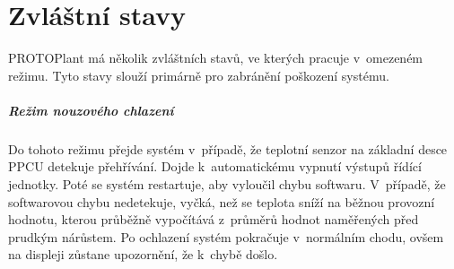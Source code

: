 \chapter{Zvláštní stavy}
PROTOPlant má několik zvláštních stavů, ve kterých pracuje v~omezeném režimu.
Tyto stavy slouží primárně pro zabránění poškození systému.

\paragraph{Režim nouzového chlazení}
\label{paragraph:CoolingMode}
Do tohoto režimu přejde systém v~případě, že teplotní senzor na základní desce PPCU detekuje přehřívání. 
Dojde k~automatickému vypnutí výstupů řídící jednotky.
Poté se systém restartuje, aby vyloučil chybu softwaru.
V~případě, že softwarovou chybu nedetekuje, vyčká, než se teplota sníží na běžnou provozní hodnotu, kterou průběžně vypočítává z~průměrů hodnot naměřených před prudkým nárůstem.
Po ochlazení systém pokračuje v~normálním chodu, ovšem na displeji zůstane upozornění, že k~chybě došlo.

\newpage